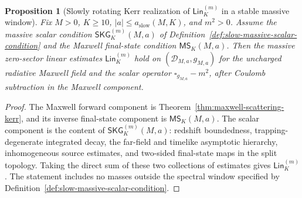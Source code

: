 \documentclass[11pt]{article}
\numberwithin{equation}{section}
\theoremstyle{plain}
\newtheorem{proposition}[theorem]{Proposition}
\theoremstyle{definition}
\theoremstyle{remark}
\newcommand{\Lin}{\mathsf{Lin}}
\newcommand{\SKG}{\mathsf{SKG}}
\newcommand{\MScat}{\mathsf{MS}}
\begin{document}
\begin{proposition}[Slowly rotating Kerr realization of \(\Lin_K^{(m)}\) in a stable massive window]\label{prop:lin-estimates-kerr-massive}
Fix \(M>0\), \(K\ge10\), \(|a|\le a_{\mathrm{slow}}(M,K)\), and \(m^2>0\).  Assume the massive scalar condition \(\SKG^{(m)}_K(M,a)\) of Definition~\ref{def:slow-massive-scalar-condition} and the Maxwell final-state condition \(\MScat_K(M,a)\).  Then the massive zero-sector linear estimates \(\Lin_K^{(m)}\) hold on \((\mathcal D_{M,a},g_{M,a})\) for the uncharged radiative Maxwell field and the scalar operator \(\square_{g_{M,a}}-m^2\), after Coulomb subtraction in the Maxwell component.
\end{proposition}

\begin{proof}
The Maxwell forward component is Theorem~\ref{thm:maxwell-scattering-kerr}, and its inverse final-state component is \(\MScat_K(M,a)\).  The scalar component is the content of \(\SKG^{(m)}_K(M,a)\): redshift boundedness, trapping-degenerate integrated decay, the far-field and timelike asymptotic hierarchy, inhomogeneous source estimates, and two-sided final-state maps in the split topology.  Taking the direct sum of these two collections of estimates gives \(\Lin_K^{(m)}\).  The statement includes no masses outside the spectral window specified by Definition~\ref{def:slow-massive-scalar-condition}.
\end{proof}
\end{document}
